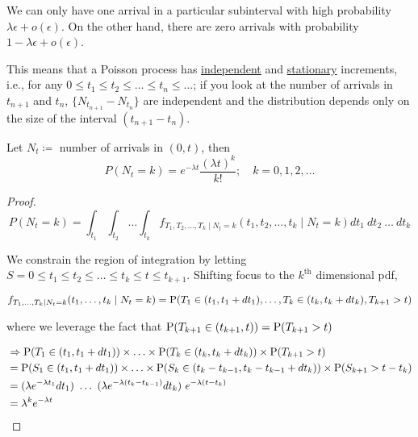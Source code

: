 We can only have one arrival in a particular subinterval with high
probability $\lambda \epsilon + o(\epsilon)$. On the other hand,
there are zero arrivals with probability
$1 - \lambda \epsilon + o(\epsilon)$.

This means that a Poisson process has \underline{independent} and
\underline{stationary} increments, i.e., for any
$0 \leq t_1 \le t_2 \le \ldots \le t_n \le \ldots$; if you look at the
number of arrivals in $t_{n+1}$ and $t_n$, $\{N_{t_{n+1}} - N_{t_{n}}\}$
are independent and the distribution depends only on the size of the
interval $(t_{n+1} - t_n)$.

\begin{theorem}
  Let $N_t \coloneq$ number of arrivals in $(0,t)$, then
  \begin{displaymath}
    P(N_t = k) = e^{-\lambda t} \frac{(\lambda t)^k}{k!};\quad k = 0,1,2,\ldots
  \end{displaymath}
  \begin{proof}

    \begin{displaymath}
      P(N_t = k) = \int_{t_1} \int_{t_2} \ldots \int_{t_k}
      f_{T_1,T_2,\ldots,T_k \mid N_t = k}(t_1,t_2,\ldots,t_k \mid N_t
      = k) dt_1\ dt_2\ \ldots\ dt_k
    \end{displaymath}

    We constrain the region of integration by letting
    $S = 0 \le t_1 \le t_2 \le \ldots \le t_k \le t \le t_{k+1}$.
    Shifting focus to the $k^{\text{th}}$ dimensional pdf,

    \begin{displaymath}
      f_{T_1,\ldots,T_k \mid N_t = k}(t_1,\ldots,t_k \mid N_t = k) =
      \operatorname{\mathrm{P}}(T_1 \in (t_1,t_1 + dt_1),\ldots,T_k \in (t_k,t_k + dt_k),T_{k+1} > t)
    \end{displaymath}

    where we leverage the fact that
    $\operatorname{\mathrm{P}}(T_{k+1} \in (t_{k+1}, t)) = \operatorname{\mathrm{P}}(T_{k+1} > t)$

    \begin{align*}
      &\Rightarrow \operatorname{\mathrm{P}}(T_1 \in (t_1,t_1 + dt_1)) \times \ldots
      \times \operatorname{\mathrm{P}}(T_k \in (t_k,t_k + dt_k)) \times \operatorname{\mathrm{P}}(T_{k+1} > t) \\
      &= \operatorname{\mathrm{P}}(S_1 \in (t_1,t_1 + dt_1)) \times \ldots \times \operatorname{\mathrm{P}}(S_k
      \in (t_k - t_{k-1},t_k - t_{k-1} + dt_k)) \times \operatorname{\mathrm{P}}(S_{k+1} >
      t - t_k) \\
      &= (\lambda e^{-\lambda t_1} dt_1)\ \ldots\ (\lambda
      e^{-\lambda (t_k - t_{k-1})} dt_k)\ e^{-\lambda (t - t_{k})} \\
      &= \lambda^k e^{-\lambda t}
    \end{align*}


\end{proof}
\end{theorem}
